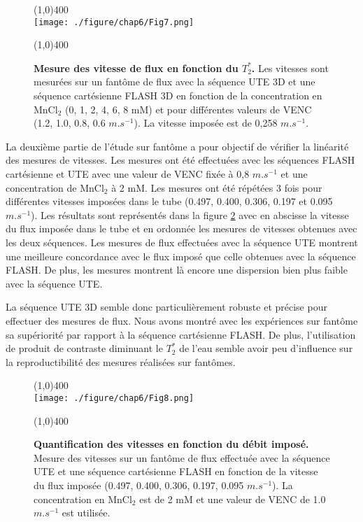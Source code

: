 \begin{figure}[h]
\centering
\line(1,0){400} \\
\texttt{[image: ./figure/chap6/Fig7.png]}
\caption[Mesure du flux en fonction du $T_2^*$.]{\label{fig:FluxFantT2} \textbf{Mesure des vitesse de flux en fonction du $T_2^*$.} Les vitesses sont mesurées sur un fantôme de flux avec la séquence UTE 3D et une séquence cartésienne FLASH 3D en fonction de la concentration en $\text{MnCl}_2$ (0, 1, 2, 4, 6, 8 mM) et pour différentes valeurs de VENC (1.2, 1.0, 0.8, 0.6 $m.s^{-1}$). La vitesse imposée est de 0,258 $m.s^{-1}$.}
\line(1,0){400} \\ 
\end{figure}

La deuxième partie de l'étude sur fantôme a pour objectif de vérifier la linéarité des mesures de vitesses. Les mesures ont été effectuées avec les séquences FLASH cartésienne et UTE avec une valeur de VENC fixée à 0,8 $m.s^{-1}$ et une concentration de $\text{MnCl}_2$ à 2 mM. Les mesures ont été répétées 3 fois pour différentes vitesses imposées dans le tube (0.497, 0.400, 0.306, 0.197 et 0.095 $m.s^{-1}$). 
Les résultats sont représentés dans la figure \ref{fig:FluxFantLinear} avec en abscisse la vitesse du flux imposée dans le tube et en ordonnée les mesures de vitesses obtenues avec les deux séquences. Les mesures de flux effectuées avec la séquence UTE montrent une meilleure concordance avec le flux imposé que celle obtenues avec la séquence FLASH. De plus, les mesures montrent là encore une dispersion bien plus faible avec la séquence UTE.

La séquence UTE 3D semble donc particulièrement robuste et précise pour effectuer des mesures de flux.  Nous avons montré avec les expériences sur fantôme sa supériorité par rapport à la séquence cartésienne FLASH. De plus, l’utilisation de produit de contraste diminuant le $T_2^*$ de l’eau semble avoir peu d’influence sur la reproductibilité des mesures réalisées sur fantômes.

\begin{figure}[H]
\centering
\line(1,0){400} \\
\texttt{[image: ./figure/chap6/Fig8.png]}
\caption[Quantification des vitesses en fonction du débit imposé.]{\label{fig:FluxFantLinear} \textbf{Quantification des vitesses en fonction du débit imposé.} Mesure des vitesses sur un fantôme de flux effectuée avec la séquence UTE et une séquence cartésienne FLASH en fonction de la vitesse du flux imposée (0.497, 0.400, 0.306, 0.197, 0.095 $m.s^{-1}$). La concentration en $\text{MnCl}_2$ est de 2 mM et une valeur de VENC de 1.0 $m.s^{-1}$ est utilisée.}
\line(1,0){400} \\ 
\end{figure}


